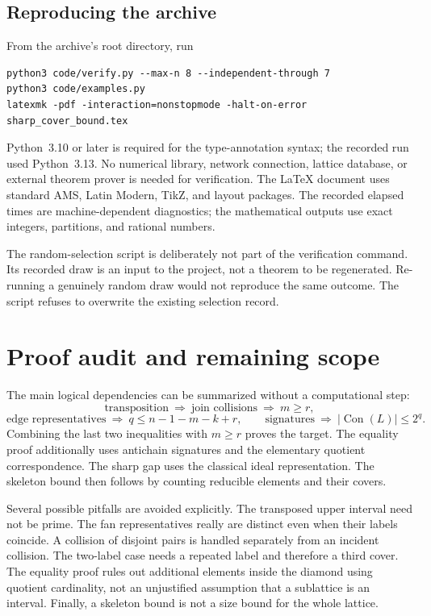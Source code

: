 \documentclass[11pt,a4paper]{article}
\numberwithin{equation}{section}
\theoremstyle{definition}
\theoremstyle{remark}
\DeclareMathOperator{\Con}{Con}
\newcommand{\card}[1]{\lvert #1\rvert}
\begin{document}
\subsection{Reproducing the archive}
From the archive's root directory, run
\begin{lstlisting}
python3 code/verify.py --max-n 8 --independent-through 7
python3 code/examples.py
latexmk -pdf -interaction=nonstopmode -halt-on-error sharp_cover_bound.tex
\end{lstlisting}
Python~3.10 or later is required for the type-annotation syntax; the recorded
run used Python~3.13. No numerical library, network connection, lattice database,
or external theorem prover is needed for verification.
The \LaTeX{} document uses standard AMS, Latin Modern, TikZ, and layout packages.
The recorded elapsed times are machine-dependent diagnostics; the mathematical
outputs use exact integers, partitions, and rational numbers.

The random-selection script is deliberately not part of the verification
command. Its recorded draw is an input to the project, not a theorem to be
regenerated. Re-running a genuinely random draw would not reproduce the same
outcome. The script refuses to overwrite the existing selection record.

\section{Proof audit and remaining scope}\label{sec:audit}
The main logical dependencies can be summarized without a computational step:
\[
 \text{transposition}
 \ \Longrightarrow\ \text{join collisions}
 \ \Longrightarrow\ m\ge r,
\]
\[
 \text{edge representatives}
 \ \Longrightarrow\ q\le n-1-m-k+r,
 \qquad
 \text{signatures}\ \Longrightarrow\ \card{\Con(L)}\le2^q.
\]
Combining the last two inequalities with $m\ge r$ proves the target.
The equality proof additionally uses antichain signatures and the elementary
quotient correspondence. The sharp gap uses the classical ideal representation.
The skeleton bound then follows by counting reducible elements and their covers.

Several possible pitfalls are avoided explicitly. The transposed upper interval
need not be prime. The fan representatives really are distinct even when their
labels coincide. A collision of disjoint pairs is handled separately from an
incident collision. The two-label case needs a repeated label and therefore a
third cover. The equality proof rules out additional elements inside the diamond
using quotient cardinality, not an unjustified assumption that a sublattice is
an interval. Finally, a skeleton bound is not a size bound for the whole lattice.
\end{document}
